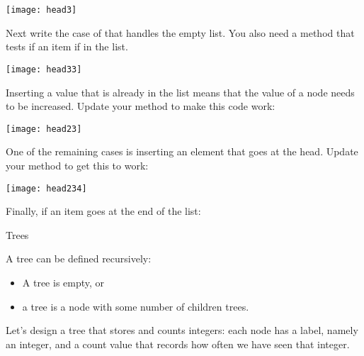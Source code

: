 \texttt{[image: head3]}

\begin{exercise}
  \label{ex:listlist-insert-empty}
  Next write the case of  that handles the empty
  list. You also need a method  that tests if an
  item if in the list.
\end{exercise}

\par

\texttt{[image: head33]}

\begin{exercise}
  \label{ex:linklist-insert-already}
  Inserting a value that is already in the list means that the
   value of a node needs to be increased. Update your
   method to make this code work:
\end{exercise}

\par

\texttt{[image: head23]}

\begin{exercise}
  \label{ex:linklist-insert-head}
  One of the remaining cases is inserting an element that goes at the
  head. Update your  method to get this to work:
\end{exercise}

\par

\texttt{[image: head234]}

\begin{exercise}
  \label{ex:linklist-insert-tail}
  Finally, if an item goes at the end of the list:
\end{exercise}


 {Trees}

\prerequisite{\ref{ch:pointer}}

A tree can be defined recursively:
\begin{itemize}
\item A tree is empty, or
\item a tree is a node with some number of children trees.
\end{itemize}
Let's design a tree that stores and counts integers: each node has a
label, namely an integer, and a count value that records how often we
have seen that integer.


